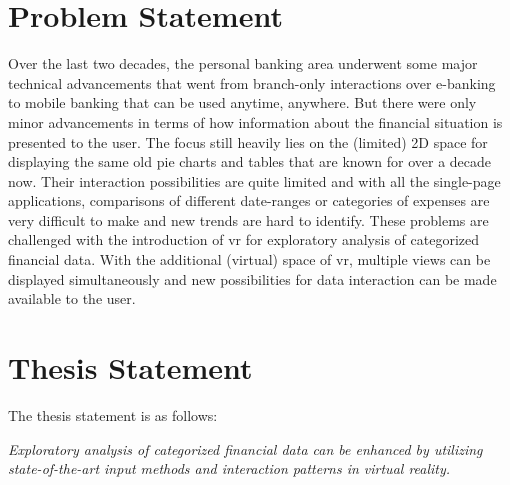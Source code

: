 
\section{Problem Statement}

Over the last two decades, the personal banking area underwent some major technical advancements that went from branch-only interactions over e-banking to mobile banking that can be used anytime, anywhere. But there were only minor advancements in terms of how information about the financial situation is presented to the user. The focus still heavily lies on the (limited) 2D space for displaying the same old pie charts and tables that are known for over a decade now. Their interaction possibilities are quite limited and with all the single-page applications, comparisons of different date-ranges or categories of expenses are very difficult to make and new trends are hard to identify. These problems are challenged with the introduction of \gls{vr} for exploratory analysis of categorized financial data. With the additional (virtual) space of \gls{vr}, multiple views can be displayed simultaneously and new possibilities for data interaction can be made available to the user.



\section{Thesis Statement}

\newcommand{\thesisstatementtext}{Exploratory analysis of categorized financial data can be enhanced by utilizing state-of-the-art input methods and interaction patterns in virtual reality.}

\label{TS}

The thesis statement is as follows:
\begin{framed}
	\textit{\thesisstatementtext}
\end{framed}


